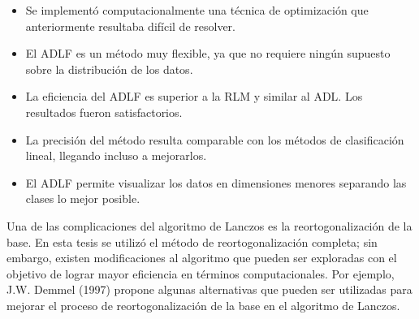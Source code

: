\begin{itemize}
\item Se implementó computacionalmente una técnica de optimización que anteriormente resultaba difícil de resolver.
\item El ADLF es un método muy flexible, ya que no requiere ningún supuesto sobre la distribución de los datos.
\item La eficiencia del ADLF es superior a la RLM y similar al ADL. Los resultados fueron satisfactorios.
\item La precisión del método resulta comparable con los métodos de clasificación lineal, llegando incluso a mejorarlos.
\item El ADLF permite visualizar los datos en dimensiones menores separando las clases lo mejor posible.
\end{itemize}

Una de las complicaciones del algoritmo de Lanczos es la reortogonalización de la base. En esta tesis se utilizó el método de reortogonalización completa; sin embargo, existen modificaciones al algoritmo que pueden ser exploradas con el objetivo de lograr mayor eficiencia en términos computacionales. Por ejemplo, J.W. Demmel (1997) \cite{demmel1997applied} propone algunas alternativas que pueden ser utilizadas para mejorar el proceso de reortogonalización de la base en el algoritmo de Lanczos.



